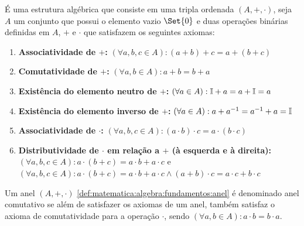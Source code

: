 \documentclass[../../main]{subfiles}
\begin{document}
\begin{defn}[Anel]
    \label{def:matematica:algebra:fundamentos:anel}

    É uma estrutura algébrica que consiste em uma tripla ordenada
    $(A,+,\cdot)$, seja $A$ um conjunto que possui o elemento vazio $\Set{0}$ e
    duas operações binárias definidas em $A$, $+$ e $\cdot$ que satisfazem os
    seguintes axiomas:

    \begin{enumerate}
        \item \textbf{Associatividade de $+$:} $(\forall a,b,c \in A):
            (a+b)+c=a+(b+c)$

        \item \textbf{Comutatividade de $+$:} $(\forall a,b \in A): a+b=b+a$

        \item \textbf{Existência do elemento neutro de $+$:} $(\forall a \in
            A): \mathbb{I}+a=a+\mathbb{I}=a$

        \item \textbf{Existência do elemento inverso de $+$:} $(\forall a \in
            A): a+a^{-1}=a^{-1}+a=\mathbb{I}$
        \item \textbf{Associatividade de $\cdot$:} $(\forall a,b,c \in A):
            (a\cdot b)\cdot c=a\cdot (b\cdot c)$

        \item \textbf{Distributividade de $\cdot$ em relação a $+$ (à esquerda
            e à direita):} $(\forall a,b,c \in A): a\cdot (b+c)=a\cdot b+a\cdot
            c$ e $(\forall a,b,c \in A): a \cdot (b+c)=a \cdot b+a \cdot c
            \wedge (a+b)\cdot c=a\cdot c+b\cdot c$
    \end{enumerate}
\end{defn}

\begin{defn}
    \label{def:matematica:algebra:fundamentos:anel-comutativo}

    Um anel $(A,+,\cdot)$ \cref{def:matematica:algebra:fundamentos:anel} é
    denominado anel comutativo se além de satisfazer os axiomas de um anel,
    também satisfaz o axioma de comutatividade para a operação $\cdot$, sendo
    $(\forall a,b \in A): a\cdot b=b\cdot a$.
\end{defn}
\end{document}
